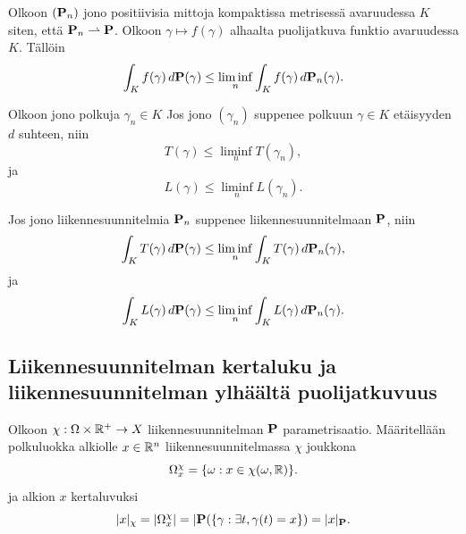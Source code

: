 \begin{lemma}\label{le:fdPLeLiminf}
    Olkoon $(\P_n)$ jono positiivisia mittoja kompaktissa metrisessä avaruudessa $K$ siten, että $\P_n \rightharpoonup \P$. Olkoon $\gamma \mapsto f(\gamma)$ alhaalta puolijatkuva funktio avaruudessa $K$. Tällöin
    \begin{equation*}
        \int_K f(\gamma) \, d\P(\gamma) \le \liminf_n \int_K f(\gamma) \, d\P_n(\gamma).
    \end{equation*}
\end{lemma}

\begin{lemma}\label{le:pysahtymisajan&pituudenLSC}
    Olkoon jono polkuja $\gamma_n \in K$ Jos jono $(\gamma_n)$ suppenee polkuun $\gamma \in K$ etäisyyden $d$ suhteen, niin
    \begin{equation*}
        T(\gamma) \le \liminf_n T(\gamma_n),
    \end{equation*}
    ja 
    \begin{equation*}
        L(\gamma) \le \liminf_n L(\gamma_n).
    \end{equation*}
\end{lemma}

\begin{lemma}
    Jos jono liikennesuunnitelmia $\P_n$ suppenee liikennesuunnitelmaan $\P$, niin 
    \begin{equation*}
        \int_K T(\gamma) \, d\P(\gamma) \le \liminf_n \int_K T(\gamma) \, d\P_n(\gamma),
    \end{equation*}
    ja
    \begin{equation*}
        \int_K L(\gamma) \, d\P(\gamma) \le \liminf_n \int_K L(\gamma) \, d\P_n(\gamma).
    \end{equation*}
\end{lemma}

\subsection{Liikennesuunnitelman kertaluku ja liikennesuunnitelman ylhäältä puolijatkuvuus}

\begin{definition}
Olkoon $\chi : \Omega \times \R^+ \to X$ liikennesuunnitelman $\P$ parametrisaatio. Määritellään polkuluokka alkiolle $x\in \R^n$ liikennesuunnitelmassa $\chi$ joukkona
\begin{equation*}
    \Omega_x^\chi = \{\omega : x \in \chi(\omega, \R)\}.
\end{equation*}
ja alkion $x$ kertaluvuksi
    \begin{equation*}
        |x|_\chi = |\Omega_x^\chi| = |\P(\{\gamma : \exists t, \gamma(t) = x\}) = |x|_\P.
    \end{equation*}
\end{definition}

